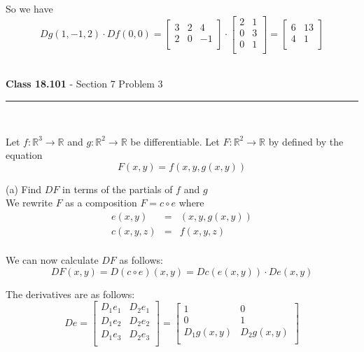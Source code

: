 \documentclass[11pt,reqno]{article}
\begin{document}
\noindent So we have
\[   D g(1,-1,2) \cdot D f(0,0) =   \left[ \begin{array}{ccc}
3 & 2 & 4\\
2 & 0 & -1\\
\end{array} \right] \cdot \left[ \begin{array}{cc}
2 & 1 \\
0 & 3 \\
0 & 1 \\
\end{array} \right] = \left[ \begin{array}{cc}
6 & 13 \\
4 & 1 \\
\end{array} \right] \] \\

\begin{flushleft} 
\textbf{Class 18.101} - Section 7 Problem 3\\
\rule{500pt}{1pt}\\
\end{flushleft} 

\noindent Let $f : \mathbb{R}^3 \to \mathbb{R}$ and $g : \mathbb{R}^2 \to \mathbb{R}$ be differentiable. Let $F : \mathbb{R}^2 \to \mathbb{R}$ by defined by the equation
\[ F(x,y) = f(x,y,g(x,y)) \] 

\noindent (a) Find $DF$ in terms of the partials of $f$ and $g$\\

\noindent We rewrite $F$ as a composition $F = c \circ e$ where 
\begin{eqnarray*}
e(x,y) &=& (x,y,g(x,y)) \\
c(x,y,z) &=& f(x,y,z) \\
\end{eqnarray*}

\noindent We can now calculate $D F$ as follows:
\[ D F(x,y) = D (c \circ e) (x,y) =  D c(e(x,y)) \cdot D e(x,y) \]

\noindent The derivatives are as follows:
\[ De = \left[ \begin{array}{cc}
D_1 e_1 & D_2 e_1 \\
D_1 e_2 & D_2 e_2 \\
D_1 e_3 & D_2 e_3 \\
\end{array} \right] =  \left[ \begin{array}{cc}
1 & 0 \\
0 & 1 \\
D_1 g(x,y) & D_2 g(x,y) \\
\end{array} \right] \]
\end{document}
